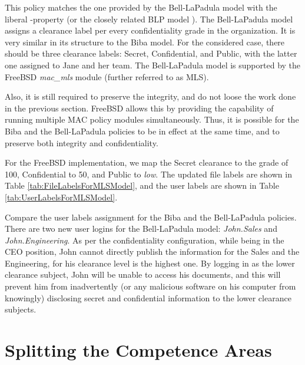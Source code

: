 \documentclass[10pt,a4paper,conference,onecolumn]{IEEEtran}
\newcommand{\KBERcode}[1]{\textsl{#1}}
\begin{document}
This policy matches the one provided by the Bell-LaPadula model with 
the liberal -property \cite{DBLP:journals/jcs/BellL96} (or the closely related BLP 
model \cite{DBLP:journals/computer/Sandhu93}). The Bell-LaPadula model assigns a clearance
label per every confidentiality grade in the organization. It is very
similar in its structure to the Biba model. For the considered case, there 
should be three clearance labels: Secret, Confidential, and
Public, with the latter one assigned to Jane and her team. The Bell-LaPadula
model is supported by the FreeBSD \KBERcode{mac\_mls} module (further referred to as MLS).

Also, it is still required to preserve the integrity, and do not loose
the work done in the previous section. FreeBSD allows this by providing
the capability of running multiple MAC policy modules simultaneously.
Thus, it is possible for the Biba and the Bell-LaPadula policies to
be in effect at the same time, and to preserve both integrity and
confidentiality.

For the FreeBSD implementation, we map the Secret clearance to the grade of
100, Confidential to 50, and Public to \KBERcode{low}. The updated file
labels are shown in Table \ref{tab:FileLabelsForMLSModel}, and the
user labels are shown in Table \ref{tab:UserLabelsForMLSModel}.

Compare the user labels assignment for the Biba and the Bell-LaPadula
policies. There are two new user logins for the Bell-LaPadula
model: \KBERcode{John.Sales} and \KBERcode{John.Engineering}.
As per the confidentiality configuration, while being in the CEO
position, John cannot directly publish the information for the Sales and
the Engineering, for his clearance level is the highest one.
By logging in as the lower clearance subject, John will be unable to access
his documents, and this will prevent him from inadvertently (or any malicious 
software on his computer from knowingly) disclosing secret and confidential
information to the lower clearance subjects.


\section{Splitting the Competence Areas}
\end{document}
